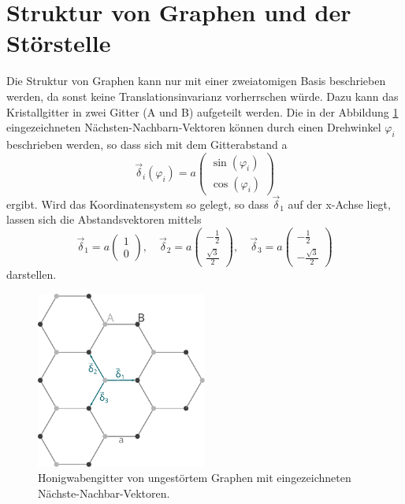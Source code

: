 \section{Struktur von Graphen und der Störstelle}
\label{sec:structure}
Die Struktur von Graphen kann nur mit einer zweiatomigen Basis beschrieben werden, da sonst keine Translationsinvarianz vorherrschen würde.
Dazu kann das Kristallgitter in zwei Gitter (A und B) aufgeteilt werden.
Die in der Abbildung \ref{fig:graphene_lattice} eingezeichneten Nächsten-Nachbarn-Vektoren können durch einen Drehwinkel $\varphi_i$ beschrieben werden, so dass sich 
mit dem Gitterabstand a
\begin{equation*}
    \vec{\delta}_i(\varphi_i) = a\begin{pmatrix} \sin (\varphi_i) \\ \cos (\varphi_i)     \end{pmatrix}
\end{equation*}
ergibt.
Wird das Koordinatensystem so gelegt, so dass $\vec{\delta}_1$ auf der x-Achse liegt, lassen sich die Abstandsvektoren mittels 
\begin{equation*}
    \vec{\delta}_1 = a \begin{pmatrix} 1            \\[4pt] 0                   \end{pmatrix}, \quad
    \vec{\delta}_2 = a \begin{pmatrix} -\frac{1}{2} \\[4pt] \frac{\sqrt{3}}{2}  \end{pmatrix}, \quad 
    \vec{\delta}_3 = a \begin{pmatrix} -\frac{1}{2} \\[4pt] -\frac{\sqrt{3}}{2} \end{pmatrix}
\end{equation*}
darstellen. \\
\begin{figure}
    \centering
    \includegraphics[width = 0.5\textwidth]{Plots/graphene_lattice.pdf}
    \caption{Honigwabengitter von ungestörtem Graphen mit eingezeichneten Nächste-Nachbar-Vektoren.}
    \label{fig:graphene_lattice}
\end{figure}
